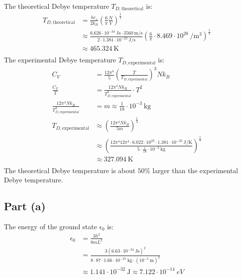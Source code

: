 \documentclass{article}
\begin{document}
The theoretical Debye temperature $T_{D,\text{theoretical}}$ is:
\begin{equation}
    \begin{split}
        T_{D,\text{theoretical}} & = \frac{hc_s}{2k_B}{\left(\frac{6}{\pi}\frac{N}{V}\right)}^{\frac{1}{3}} \\
        & \approx \frac{6.626 \cdot 10^{-34}~\unit{\joule\second} \cdot 3560~\unit{\meter\per\second}}{2 \cdot 1.381 \cdot 10^{-23}~\unit{\joule\per\second}}{\left(\frac{6}{\pi} \cdot 8.469 \cdot 10^{28}~\unit{\per\meter\cubed}\right)}^{\frac{1}{3}} \\
        & \approx 465.324~\unit{\kelvin} \\
    \end{split}
\end{equation}
The experimental Debye temperature $T_{D,\text{experimental}}$ is:
\begin{equation}
    \begin{split}
        C_V & = \frac{12\pi^4}{5} {\left(\frac{T}{T_{D,\text{experimental}}}\right)}^3 Nk_B \\
        \frac{C_V}{T} & = \frac{12\pi^4 Nk_B}{T_{D,\text{experimental}}^3} \cdot T^2 \\
        \frac{12\pi^4 Nk_B}{T_{D,\text{experimental}}^3} & = m \approx \frac{1}{18} \cdot 10^{-3}~\unit{\kilo\gram} \\
        T_{D,\text{experimental}} & \approx {\left(\frac{12\pi^4 Nk_B}{5m}\right)}^{\frac{1}{3}} \\
        & \approx {\left(\frac{12\pi^4 12\pi^4 \cdot 6.022 \cdot 10^{23} \cdot 1.381 \cdot 10^{-23}~\unit{\joule\per\kelvin}}{5 \cdot \frac{1}{18} \cdot 10^{-3}~\unit{\kilo\gram}}\right)}^{\frac{1}{3}} \\
        & \approx 327.094~\unit{\kelvin} \\
    \end{split}
\end{equation}
The theoretical Debye temperature is about $50\%$ larger than the experimental Debye temperature.

\clearpage

\subsection*{Part (a)}
The energy of the ground state $\epsilon_0$ is:
\begin{equation}
    \begin{split}
        \epsilon_0 & = \frac{3h^2}{8mL^2} \\
        & = \frac{3{\left(6.63 \cdot 10^{-34}~\unit{\joule\second}\right)}^2}{8 \cdot 87 \cdot 1.66 \cdot 10^{-27}~\unit{\kilo\gram} \cdot {\left(10^{-5}~\unit{\meter}\right)}^2} \\
        & \approx 1.141 \cdot 10^{-32}~\unit{\joule} \approx 7.122 \cdot 10^{-14}~\unit{eV}
    \end{split}
\end{equation}
\end{document}
